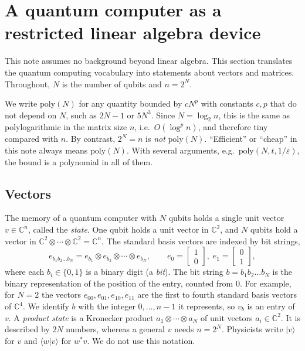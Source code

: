 \documentclass[11pt,a4paper]{article}
\newcommand{\C}{\mathbb{C}}
\begin{document}
\section{A quantum computer as a restricted linear algebra device}\label{sec:device}

This note assumes no background beyond linear algebra. This section
translates the quantum computing vocabulary into statements about
vectors and matrices. Throughout, $N$ is the number of qubits and
$n=2^N$.

We write $\mathrm{poly}(N)$ for any quantity bounded by $cN^p$ with
constants $c,p$ that do not depend on $N$, such as $2N-1$ or $5N^3$. Since
$N=\log_2n$, this is the same as polylogarithmic in the matrix size $n$,
i.e.\ $O(\log^pn)$, and therefore tiny compared with $n$. By contrast,
$2^N=n$ is \emph{not} $\mathrm{poly}(N)$. ``Efficient'' or ``cheap'' in this note
always means $\mathrm{poly}(N)$. With several arguments, e.g.\
$\mathrm{poly}(N,t,1/\varepsilon)$, the bound is a polynomial in all of
them.

\subsection{Vectors}\label{sec:vectors}

The memory of a quantum computer with $N$ qubits holds a single unit
vector $v\in\C^n$, called the \emph{state}. One qubit holds a unit
vector in $\C^2$, and $N$ qubits hold a vector in
$\C^2\otimes\cdots\otimes\C^2=\C^n$. The standard basis vectors are
indexed by bit strings,
\[
  e_{b_1b_2\dots b_N} = e_{b_1}\otimes e_{b_2}\otimes\cdots\otimes e_{b_N},
  \qquad e_0=\begin{bmatrix}1\\0\end{bmatrix},\; e_1=\begin{bmatrix}0\\1\end{bmatrix},
\]
where each $b_i\in\{0,1\}$ is a binary digit (a \emph{bit}). The bit
string $b=b_1b_2\dots b_N$ is the binary representation of the position
of the entry, counted from $0$. For example, for $N=2$ the vectors
$e_{00},e_{01},e_{10},e_{11}$ are the first to fourth standard basis
vectors of $\C^4$. We identify $b$ with the integer $0,\dots,n-1$ it
represents, so $v_b$ is an entry of $v$. A
\emph{product state} is a Kronecker product $a_1\otimes\cdots\otimes a_N$ of
unit vectors $a_i\in\C^2$. It is described by $2N$ numbers, whereas a
general $v$ needs $n=2^N$. Physicists write $|v\rangle$ for $v$ and
$\langle w|v\rangle$ for $w^*v$. We do not use this notation.
\end{document}
